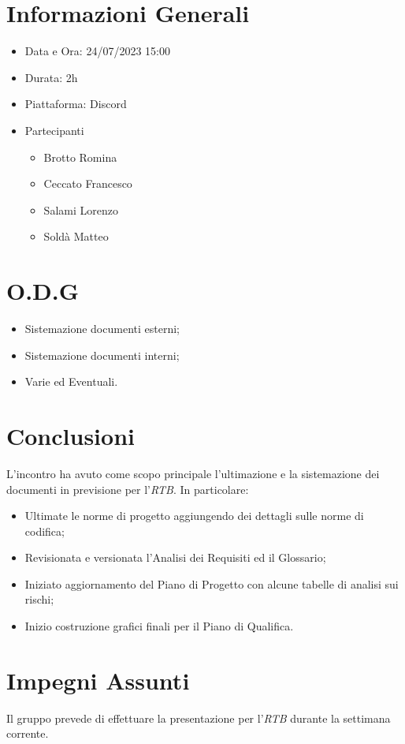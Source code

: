 \documentclass[a4paper, 12pt]{article}
\begin{document}
\makefrontpage

\section*{Informazioni Generali}
\begin{itemize}
    \item Data e Ora: 24/07/2023 15:00
    \item Durata: 2h
    \item Piattaforma: Discord
    \item Partecipanti
    \begin{itemize}
        \item Brotto Romina
        \item Ceccato Francesco
        \item Salami Lorenzo
        \item Soldà Matteo
    \end{itemize}
\end{itemize}

\section*{O.D.G}
\begin{itemize}
    \item Sistemazione documenti esterni;
    \item Sistemazione documenti interni;
    \item Varie ed Eventuali.
\end{itemize}

\section*{Conclusioni}
L'incontro ha avuto come scopo principale l'ultimazione e la sistemazione dei documenti in previsione per l'\textit{RTB}.
In particolare:
\begin{itemize}
    \item Ultimate le norme di progetto aggiungendo dei dettagli sulle norme di codifica;
    \item Revisionata e versionata l'Analisi dei Requisiti ed il Glossario;
    \item Iniziato aggiornamento del Piano di Progetto con alcune tabelle di analisi sui rischi;
    \item Inizio costruzione grafici finali per il Piano di Qualifica.
\end{itemize}

\section*{Impegni Assunti}
Il gruppo prevede di effettuare la presentazione per l'\textit{RTB} durante la settimana corrente.
\end{document}
